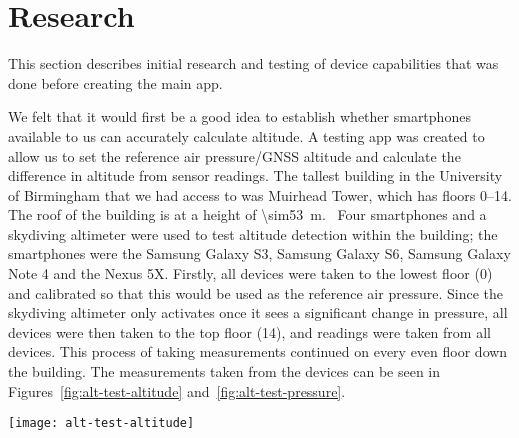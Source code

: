\section{Research}\label{sec:research}
This section describes initial research and testing of device capabilities that was done before creating the main app.

We felt that it would first be a good idea to establish whether smartphones available to us can accurately calculate altitude. A testing app was created to allow us to set the reference air pressure/GNSS altitude and calculate the difference in altitude from sensor readings.
The tallest building in the University of Birmingham that we had access to was Muirhead Tower, which has floors 0--14. The roof of the building is at a height of \SI{\sim53}{\metre}.~\cite{emporis_emporis_????} Four smartphones and a skydiving altimeter were used to test altitude detection within the building; the smartphones were the Samsung Galaxy S3, Samsung Galaxy S6, Samsung Galaxy Note 4 and the Nexus 5X.
Firstly, all devices were taken to the lowest floor (0) and calibrated so that this would be used as the reference air pressure. Since the skydiving altimeter only activates once it sees a significant change in pressure, all devices were then taken to the top floor (14), and readings were taken from all devices. This process of taking measurements continued on every even floor down the building.
The measurements taken from the devices can be seen in Figures~\ref{fig:alt-test-altitude} and~\ref{fig:alt-test-pressure}.

\begin{figure*}[ht]
    \centering
    \texttt{[image: alt-test-altitude]}
    \caption{Altitude measurements from smartphones in Muirhead Tower}\label{fig:alt-test-altitude}
\end{figure*}


